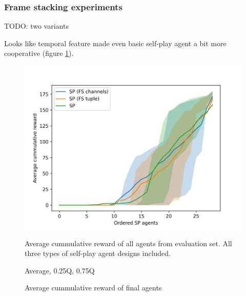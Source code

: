 \subsubsection{Frame stacking experiments}
TODO: two variants

Looks like temporal feature made even basic self-play agent a bit more cooperative (figure \ref{FSVariantsOrderedAvg}).

\begin{figure}[!ht]
    \centering
    \includegraphics*[width=13cm]{../img/FSVariantsOrderedAvg.png}

    \caption{Average cummulative reward of final agents}
    \label{FSVariantsOrderedAvg}
    \medskip
    \small 
    Average cummulative reward of all agents from evaluation set.
    All three types of self-play agent designs included.

    Average, 0.25Q, 0.75Q

\end{figure}

